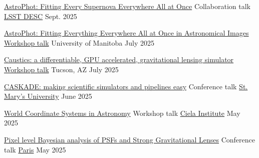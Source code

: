 \begin{cvhonors}
  \cvhonor
    {\href{https://docs.google.com/presentation/d/1Xk_cMjgVCJiSDqJqp3tmjD4O5769H976IrANdZYqj3Q/edit?usp=sharing}{AstroPhot: Fitting Every Supernova Everywhere All at Once}} %
    {Collaboration talk} %
    {\href{https://lsstdesc.org/}{LSST DESC}} %
    {Sept. 2025} %
    
  \cvhonor
    {\href{https://docs.google.com/presentation/d/15ozNX089bBlEWuUC_6C5jzzwwjpuLFZfq_g27lvHDUY/edit?usp=sharing}{AstroPhot: Fitting Everything Everywhere All at Once in Astronomical Images}} %
    {\href{https://www.castormission.org/}{Workshop talk}} %
    {University of Manitoba} %
    {July 2025} %
    
  \cvhonor
    {\href{https://docs.google.com/presentation/d/1oqOhryPzvI7JsZSpOmzfSSDjP_7B166wwKoiiUJkBI8/edit?usp=sharing}{Caustics: a differentiable, GPU accelerated, gravitational lensing simulator}} %
    {\href{https://rubinobservatory.org/events/rcw-2025}{Workshop talk}} %
    {Tucson, AZ} %
    {July 2025} %
    
  \cvhonor
    {\href{https://docs.google.com/presentation/d/1qYE5HYPDPoZjvNfl3p_2_9TEz865F6WVvN_h2euFp7g/edit?usp=sharing}{CASKADE: making scientific simulators and pipelines easy}} %
    {Conference talk} %
    {\href{https://www.ap.smu.ca/~casca2025/}{St. Mary's University}} %
    {June 2025} %

  \cvhonor
    {\href{https://drive.google.com/file/d/1t61xzVdZ9yUP9QHJxgCUZbfoh316tE9n/view?usp=sharing}{World Coordinate Systems in Astronomy}} %
    {Workshop talk} %
    {\href{https://ciela.science/}{Ciela Institute}} %
    {May 2025} %

  \cvhonor
    {\href{https://docs.google.com/presentation/d/1pClhhYn8hWIM6XmxDVY3SWvmdV4xLuugIGztheVCWK0/edit?usp=sharing}{Pixel level Bayesian analysis of PSFs and Strong Gravitational Lenses}} %
    {Conference talk} %
    {\href{https://indico.in2p3.fr/event/35882/}{Paris}} %
    {May 2025} %


\end{cvhonors}
